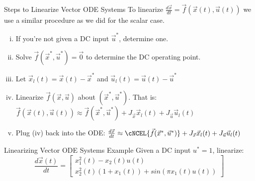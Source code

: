 \documentclass{beamer}
\begin{document}
	\begin{frame}{Steps to Linearize Vector ODE Systems}
	To linearize $\frac{d\vec{x}}{dt} = \vec{f}(\vec{x}(t), \vec{u}(t))$ we use a similar procedure as we did for the scalar case. \pause 
	\begin{enumerate}[(i)]
	    \item If you're not given a DC input $\vec{u}^*$, determine one. \pause \\
	    \item Solve $\vec{f}(\vec{x}^*, \vec{u}^*) = \vec{0}$ to determine the DC operating point. \pause \\
	    \item Let $\vec{x}_l(t) = \vec{x}(t) - \vec{x}^*$ and $\vec{u}_l(t) = \vec{u}(t) - \vec{u}^*$ \pause \\
	    \item Linearize $\vec{f}(\vec{x}, \vec{u})$ about $(\vec{x}^*, \vec{u}^*)$. That is: $\vec{f}(\vec{x}(t), \vec{u}(t)) \approx \vec{f}(\vec{x}^*, \vec{u}^*) + J_{\vec{x}}\vec{x}_l(t) + J_{\vec{u}}\vec{u}_l(t)$ \pause \\
	    \item Plug (iv) back into the ODE: $\frac{d\vec{x}}{dt} \approx \cNCEL{\vec{f}(\vec{x}^*, \vec{u}^*)} + J_{\vec{x}}\vec{x}_l(t) + J_{\vec{u}}\vec{u}_l(t)$
	\end{enumerate}

	\end{frame}

	\begin{frame}{Linearizing Vector ODE Systems Example}
	    Given a DC input $u^* = 1$, linearize: 
	    \[
	    \frac{d\vec{x}(t)}{dt} = \begin{bmatrix}
	    x_1^2(t) - x_2(t)u(t)\\
	    x_2^2(t)(1 + x_1(t)) + sin(\pi x_1(t)u(t))
	    \end{bmatrix}
	    \]
	    
	\end{frame}
\end{document}
